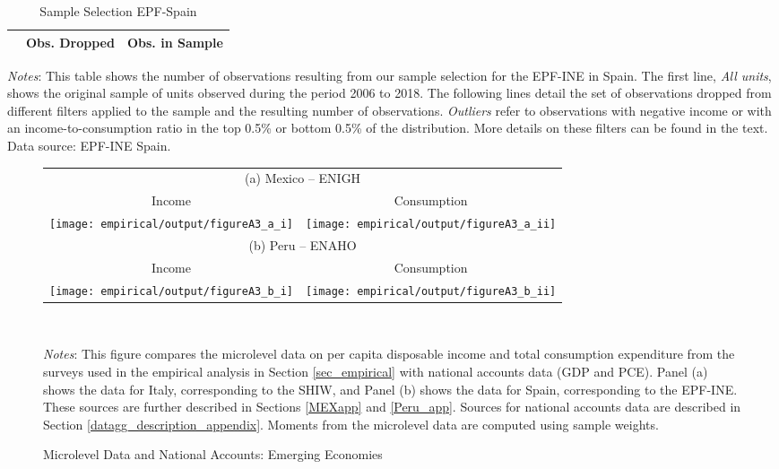 \documentclass[12pt]{article}
\begin{document}
\begin{spacing}{1.5}
\begin{table}[H]
\begin{centering}
\captionsetup{justification=centering}
    \caption{Sample Selection EPF-Spain  \label{observations_spain}}
    \vspace*{-0.2em}
    \begin{tabular}{lcc}
    \midrule \midrule
     &Obs. Dropped & Obs. in Sample \\
    \toprule

       \midrule \midrule
    \end{tabular}
    \end{centering}
   \flushleft \footnotesize{\textit{Notes}: This table shows the number of observations resulting from our sample selection for the EPF-INE in Spain. The first line, \textit{All units}, shows the original sample of units observed during the period 2006 to 2018. The following lines detail the set of observations dropped from different filters applied to the sample and the resulting number of observations.  \textit{Outliers} refer to observations  with negative income or with an income-to-consumption ratio in the top 0.5\% or bottom 0.5\% of the distribution. More details on these filters can be found in the text. Data source: EPF-INE Spain.}
\end{table}


\begin{figure}[H]
\begin{tabular}{cc}
\multicolumn{2}{c}{(a) Mexico -- ENIGH} \vspace{.4em}  \\
 Income & Consumption \\
\texttt{[image: empirical/output/figureA3\_a\_i]} &
\texttt{[image: empirical/output/figureA3\_a\_ii]} \\
\multicolumn{2}{c}{(b) Peru  -- ENAHO} \vspace{.4em}  \\
 Income & Consumption \\
\texttt{[image: empirical/output/figureA3\_b\_i]} &
\texttt{[image: empirical/output/figureA3\_b\_ii]}  \\
\end{tabular} \\
\caption{Microlevel Data and National Accounts: Emerging Economies \label{macro_micro_ems}}
\medskip{}
\raggedright{}\textit{\footnotesize{}Notes}{\footnotesize{}: This figure compares the microlevel data on per capita disposable income and total consumption expenditure from the surveys used in the empirical analysis in Section \ref{sec_empirical} with national accounts data (GDP and PCE).  Panel (a) shows the data for Italy, corresponding to the SHIW, and Panel (b) shows the data for Spain, corresponding to the EPF-INE.  These sources are further described in Sections \ref{MEXapp} and \ref{Peru_app}. Sources for national accounts data are described in Section  \ref{datagg_description_appendix}. Moments from the microlevel data are computed using sample weights.
}{\footnotesize\par}
\end{figure}



\end{spacing}
\end{document}
